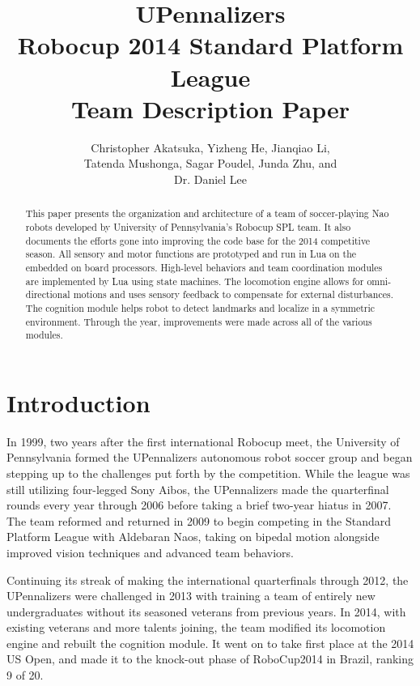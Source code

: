 \documentclass{article}
\title{UPennalizers \\Robocup 2014 Standard Platform League \\Team Description Paper}
\author{Christopher Akatsuka, Yizheng He, Jianqiao Li,\\ Tatenda Mushonga, Sagar Poudel, Junda Zhu, and\\Dr. Daniel Lee}
\affil{General Robotics Automation, Sensing and Perception (GRASP) Laboratory \\University of Pennsylvania}
\date{} %
\begin{document}
\maketitle

\begin{abstract}
 	This paper presents the organization and architecture of a team of soccer-playing Nao robots developed by University of Pennsylvania's Robocup SPL team. It also documents the efforts gone into improving the code base for the 2014 competitive season. All sensory and motor functions are prototyped and run in Lua on the embedded on board processors. High-level behaviors and team coordination modules are implemented by Lua using state machines. The locomotion engine allows for omni-directional motions and uses sensory feedback to compensate for external disturbances. The cognition module helps robot to detect landmarks and localize in a symmetric environment. Through the year, improvements were made across all of the various modules. 
\end{abstract}

\pagebreak



\section{Introduction}
	In 1999, two years after the first international Robocup meet, the University of Pennsylvania formed the UPennalizers autonomous robot soccer group and began stepping up to the challenges put forth by the competition. While the league was still utilizing four-legged Sony Aibos, the UPennalizers made the quarterfinal rounds every year through 2006 before taking a brief two-year hiatus in 2007. The team reformed and returned in 2009 to begin competing in the Standard Platform League with Aldebaran Naos, taking on bipedal motion alongside improved vision techniques and advanced team behaviors. 

	Continuing its streak of making the international quarterfinals through 2012, the UPennalizers were challenged in 2013 with training a team of entirely new undergraduates without its seasoned veterans from previous years. In 2014, with existing veterans and more talents joining, the team modified its locomotion engine and rebuilt the cognition module. It went on to take first place at the 2014 US Open, and made it to the knock-out phase of RoboCup2014 in Brazil, ranking 9 of 20.
\end{document}
